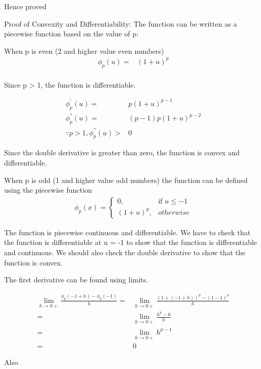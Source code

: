 \documentclass{article}
\begin{document}
\begin{description}
    Hence proved
  \item{Proof of Convexity and Differentiability:}
    The function can be written as a piecewise function based on the value of p:

    When p is even (2 and higher value even numbers)
    \begin{align*}
        \phi_{p}(u) = & {(1+u)}^p \\
    \end{align*}

    Since p > 1, the function is differentiable.

    \begin{align*}
        \phi^{'}_{p}(u) = & p{(1+u)}^{p - 1} \\
        \phi^{''}_{p}(u) = & {(p - 1)}p{(1+u)}^{p - 2} \\
        \because p > 1, \phi^{''}_{p}(u) > & 0
    \end{align*}

    Since the double derivative is greater than zero, the function is convex and differentiable.


    When p is odd (1 and higher value odd numbers) the function can be defined using the piecewise function
    \begin{align*}
        \phi_{p}\left(x\right) = 
        \begin{cases}
          0, & \textrm{if } u \le -1 \\
          {(1+u)}^p, & otherwise
        \end{cases}
    \end{align*}

    The function is piecewise continuous and differentiable. We have to check that the function is differentiable at u = -1 to show that the function is differentiable and continuous.  We should also check the double derivative to show that the function is convex.

    The first derivative can be found using limits.

    \begin{align*}
      \lim_{h \to 0+} \frac{\phi_{p}(-1 + h) - \phi_{p}(-1)}{h}=&  \lim_{h \to 0+} \frac{{(1 + (-1 + h))}^{p} - {(1 -1)}^{p}}{h} \\
      = & \lim_{h \to 0+} \frac{h^{p} - 0}{h} \\
      = & \lim_{h \to 0+} h^{p - 1} \\
      = & 0
    \end{align*}

    Also 
    

\end{description}
\end{document}
